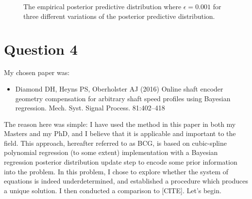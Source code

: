 \documentclass{article}
\begin{document}
\begin{figure}[htb!]
		\caption{The empirical posterior predictive distribution where $\epsilon = 0.001$ for three different variations of the posterior predictive distribution.}
		\label{fig:Q3_post_predict_samples}
	\end{figure}


	\clearpage
	
	\section{Question 4}
	My chosen paper was:
	\begin{itemize}
		\item Diamond DH, Heyns PS, Oberholster AJ (2016) Online shaft encoder geometry compensation for arbitrary shaft speed profiles using Bayesian regression. Mech. Syst. Signal Process. 81:402–418
	\end{itemize}
	
	The reason here was simple: I have used the method in this paper in both my Masters and my PhD, and I believe that it is applicable and important to the field. This approach, hereafter referred to as BCG, is based on cubic-spline polynomial regression (to some extent) implementation with a Bayesian regression posterior distribution update step to encode some prior information into the problem. In this problem, I chose to explore whether the system of equations is indeed underdetermined, and established a procedure which produces a unique solution. I then conducted a comparison to [CITE]. Let's begin.
	
\end{document}
